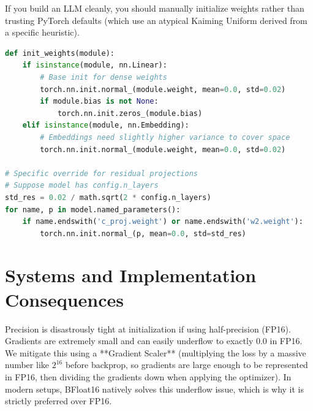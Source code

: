 If you build an LLM cleanly, you should manually initialize weights rather than trusting PyTorch defaults (which use an atypical Kaiming Uniform derived from a specific heuristic).

\begin{lstlisting}[language=Python]
def init_weights(module):
    if isinstance(module, nn.Linear):
        # Base init for dense weights
        torch.nn.init.normal_(module.weight, mean=0.0, std=0.02)
        if module.bias is not None:
            torch.nn.init.zeros_(module.bias)
    elif isinstance(module, nn.Embedding):
        # Embeddings need slightly higher variance to cover space
        torch.nn.init.normal_(module.weight, mean=0.0, std=0.02)

# Specific override for residual projections
# Suppose model has config.n_layers
std_res = 0.02 / math.sqrt(2 * config.n_layers)
for name, p in model.named_parameters():
    if name.endswith('c_proj.weight') or name.endswith('w2.weight'):
        torch.nn.init.normal_(p, mean=0.0, std=std_res)
\end{lstlisting}

\section{Systems and Implementation Consequences}
\label{ch:12:sec:systems}

Precision is disastrously tight at initialization if using half-precision (FP16). Gradients are extremely small and can easily underflow to exactly $0.0$ in FP16. We mitigate this using a **Gradient Scaler** (multiplying the loss by a massive number like $2^{16}$ before backprop, so gradients are large enough to be represented in FP16, then dividing the gradients down when applying the optimizer). In modern setups, BFloat16 natively solves this underflow issue, which is why it is strictly preferred over FP16.

